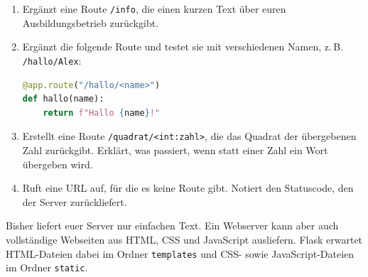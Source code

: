 \documentclass[11pt, a4paper, oneside]{article}
\begin{document}
	\begin{enumerate}[label=\alph*)]
		\item Ergänzt eine Route \texttt{/info}, die einen kurzen Text über euren Ausbildungsbetrieb zurückgibt.
		\item Ergänzt die folgende Route und testet sie mit verschiedenen Namen, z.\,B. \texttt{/hallo/Alex}:
\begin{lstlisting}[language=python]
@app.route("/hallo/<name>")
def hallo(name):
    return f"Hallo {name}!"
\end{lstlisting}
		\item Erstellt eine Route \texttt{/quadrat/<int:zahl>}, die das Quadrat der übergebenen Zahl zurückgibt.
		Erklärt, was passiert, wenn statt einer Zahl ein Wort übergeben wird.
		\item Ruft eine URL auf, für die es keine Route gibt.
		Notiert den Statuscode, den der Server zurückliefert.
	\end{enumerate}
	
	
	
	Bisher liefert euer Server nur einfachen Text.
	Ein Webserver kann aber auch vollständige Webseiten aus HTML, CSS und JavaScript ausliefern.
	Flask erwartet HTML-Dateien dabei im Ordner \texttt{templates} und CSS- sowie JavaScript-Dateien im Ordner \texttt{static}.
	
\end{document}
